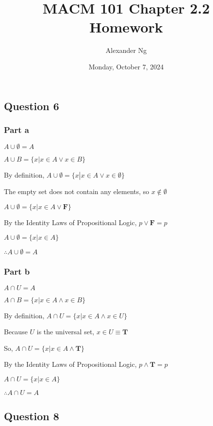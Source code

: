 \documentclass[12pt]{article}
\begin{document}
\title{MACM 101 Chapter 2.2 Homework}
\author{Alexander Ng}
\date{Monday, October 7, 2024}

\maketitle

\subsection*{Question 6}

\subsubsection*{Part a}

$A \cup \emptyset = A$

$A \cup B = \{ x \left| x \in A \lor x \in B \right.\}$

By definition, $A \cup \emptyset = \{ x \left| x \in A \lor x \in \emptyset \right.\}$

The empty set does not contain any elements, so $x \notin \emptyset$

$A \cup \emptyset = \{ x \left| x \in A \lor \mathbf{F} \right.\}$

By the Identity Laws of Propositional Logic, $p \lor \mathbf{F} = p$

$A \cup \emptyset = \{ x \left| x \in A \right.\}$

$\therefore A \cup \emptyset = A$

\subsubsection*{Part b}

$A \cap U = A$

$A \cap B = \{ x \left| x \in A \land x \in B \right.\}$

By definition, $A \cap U = \{ x \left| x \in A \land x \in U \right.\}$

Because $U$ is the universal set, $x \in U \equiv \mathbf{T}$

So, $A \cap U = \{ x \left| x \in A \land \mathbf{T} \right.\}$

By the Identity Laws of Propositional Logic, $p \land \mathbf{T} = p$

$A \cap U = \{ x \left| x \in A \right.\}$

$\therefore A \cap U = A$

\subsection*{Question 8}
\end{document}
